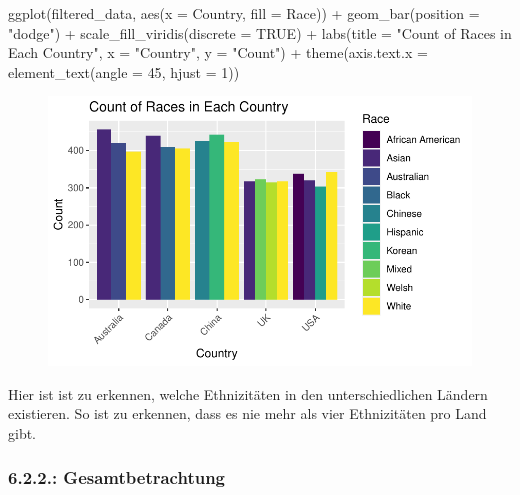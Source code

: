 \documentclass[
  letterpaper,
  DIV=11,
  numbers=noendperiod]{scrartcl}
\newenvironment{Shaded}{\begin{snugshade}}{\end{snugshade}}
\newcommand{\AttributeTok}[1]{\textcolor[rgb]{0.40,0.45,0.13}{#1}}
\newcommand{\ConstantTok}[1]{\textcolor[rgb]{0.56,0.35,0.01}{#1}}
\newcommand{\DecValTok}[1]{\textcolor[rgb]{0.68,0.00,0.00}{#1}}
\newcommand{\FunctionTok}[1]{\textcolor[rgb]{0.28,0.35,0.67}{#1}}
\newcommand{\NormalTok}[1]{\textcolor[rgb]{0.00,0.23,0.31}{#1}}
\newcommand{\SpecialCharTok}[1]{\textcolor[rgb]{0.37,0.37,0.37}{#1}}
\newcommand{\StringTok}[1]{\textcolor[rgb]{0.13,0.47,0.30}{#1}}
\begin{document}
\begin{Shaded}
\begin{Highlighting}[]
\FunctionTok{ggplot}\NormalTok{(filtered\_data, }\FunctionTok{aes}\NormalTok{(}\AttributeTok{x =}\NormalTok{ Country, }\AttributeTok{fill =}\NormalTok{ Race)) }\SpecialCharTok{+}
  \FunctionTok{geom\_bar}\NormalTok{(}\AttributeTok{position =} \StringTok{"dodge"}\NormalTok{) }\SpecialCharTok{+}
  \FunctionTok{scale\_fill\_viridis}\NormalTok{(}\AttributeTok{discrete =} \ConstantTok{TRUE}\NormalTok{) }\SpecialCharTok{+}
  \FunctionTok{labs}\NormalTok{(}\AttributeTok{title =} \StringTok{"Count of Races in Each Country"}\NormalTok{,}
       \AttributeTok{x =} \StringTok{"Country"}\NormalTok{,}
       \AttributeTok{y =} \StringTok{"Count"}\NormalTok{) }\SpecialCharTok{+}
  \FunctionTok{theme}\NormalTok{(}\AttributeTok{axis.text.x =} \FunctionTok{element\_text}\NormalTok{(}\AttributeTok{angle =} \DecValTok{45}\NormalTok{, }\AttributeTok{hjust =} \DecValTok{1}\NormalTok{))}
\end{Highlighting}
\end{Shaded}

\begin{figure}[H]

{\centering \includegraphics{main_doc_files/figure-pdf/unnamed-chunk-73-1.pdf}

}

\end{figure}

Hier ist ist zu erkennen, welche Ethnizitäten in den unterschiedlichen
Ländern existieren. So ist zu erkennen, dass es nie mehr als vier
Ethnizitäten pro Land gibt.

\hypertarget{gesamtbetrachtung}{%
\subsubsection{6.2.2.: Gesamtbetrachtung}\label{gesamtbetrachtung}}
\end{document}
